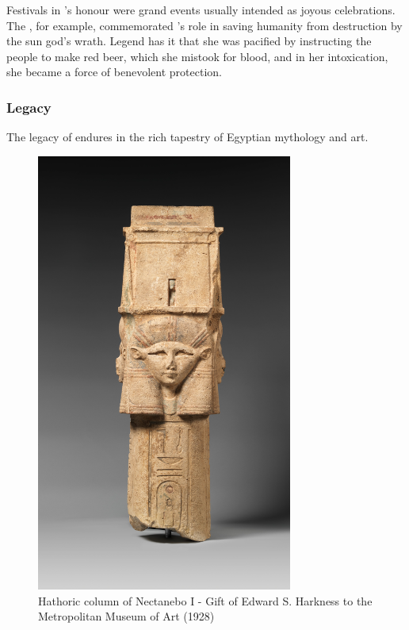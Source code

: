 Festivals in 's honour were grand events usually intended as joyous celebrations. The , for example, commemorated 's role in saving humanity from destruction by the sun god's wrath. Legend has it that she was pacified by  instructing the people to make red beer, which she mistook for blood, and in her intoxication, she became a force of benevolent protection.

\subsubsection*{Legacy}

The legacy of  endures in the rich tapestry of Egyptian mythology and art.

\begin{figure} [H]
	\centering
	\includegraphics[width=0.75\textwidth]{../photos/Hathor_Column_Nectanebo}
	\caption{Hathoric column of Nectanebo I - Gift of Edward S. Harkness to the Metropolitan Museum of Art (1928)}
\end{figure}

